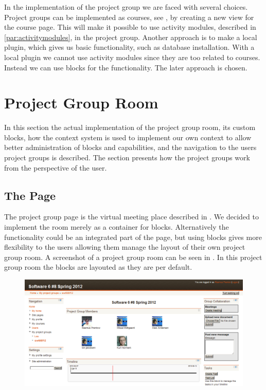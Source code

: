 In the implementation of the project group we are faced with several choices. 
Project groups can be implemented as courses, see , by creating a new view for the course page.  
This will make it possible to use activity modules, described in \ref{par:activitymodules}, in the project group. 
Another approach is to make a local plugin, which gives us basic functionality, such as database installation. 
With a local plugin we cannot use activity modules since they are too related to courses. 
Instead we can use blocks for the functionality. 
The later approach is chosen. 

\section{Project Group Room}
In this section the actual implementation of the project group room, its custom blocks, how the context system is used to implement our own context to allow better administration of blocks and capabilities, and the navigation to the users project groups is described.
The section presents how the project groups work from the perspective of the user. 


\subsection{The Page}
\label{sub:page}
The project group page is the virtual meeting place described in .
We decided to implement the room merely as a container for blocks. 
Alternatively the functionality could be an integrated part of the page, but using blocks gives more flexibility to the users allowing them manage the layout of their own project group room. 
A screenshot of a project group room can be seen in . 
In this project group room the blocks are layouted as they are per default. 
\begin{figure}[h]
	\centering
		\includegraphics[width=\textwidth]{images/projectgroupnoedit.png}
	\label{fig:projectgroupnoedit}
\end{figure}

